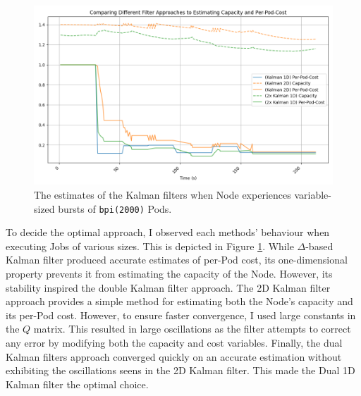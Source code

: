 \begin{figure}[H]
    \centering
    \includegraphics[width=\textwidth]{images/filter-comparison.png}
    \caption{The estimates of the Kalman filters when Node experiences
    variable-sized bursts of \texttt{bpi(2000)} Pods.}
    \label{fig:filter-evaluation}
\end{figure}
To decide the optimal approach, I observed each methods' behaviour when
executing Jobs of various sizes. This is depicted in Figure
\ref{fig:filter-evaluation}.
While $\Delta$-based Kalman filter produced accurate estimates of per-Pod cost,
its one-dimensional property prevents it from estimating the capacity of the
Node. However, its stability inspired the double Kalman filter approach.
The 2D Kalman filter approach provides a simple method for estimating both the
Node's capacity and its per-Pod cost. However, to ensure faster convergence, I
used large constants in the $Q$ matrix. This resulted in large oscillations
as the filter attempts to correct any error by modifying both the capacity and
cost variables. Finally, the dual Kalman filters approach converged quickly on
an accurate estimation without exhibiting the oscillations seens in the 2D
Kalman filter. This made the Dual 1D Kalman filter the optimal choice.

